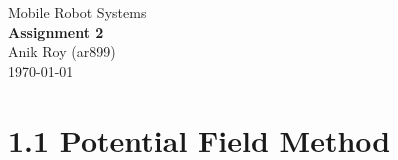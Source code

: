 \documentclass[12pt,a4paper]{article}
\begin{document}
\vfil

\begin{center}
	{\Large Mobile Robot Systems} \\
	\vspace{0.4in}
	{\huge \bf Assignment 2} \\
	\vspace{0.4in}
	{\large Anik Roy (ar899)} \\
	\vspace{0.1in}
	{\large \today} \\
\end{center}
\vspace{0.4in}


\section*{1.1 Potential Field Method}
\end{document}
